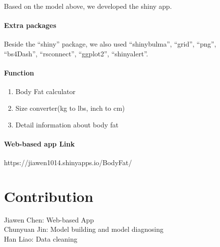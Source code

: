\documentclass[11pt]{article}
\providecommand{\tightlist}{%
      \setlength{\itemsep}{0pt}\setlength{\parskip}{0pt}}
\begin{document}
Based on the model above, we developed the shiny app.

\hypertarget{extra-packages}{%
\paragraph{Extra packages}\label{extra-packages}}

Beside the ``shiny'' package, we also used ``shinybulma'', ``grid'',
``png'', ``bs4Dash'', ``rsconnect'', ``ggplot2'', ``shinyalert''.

\hypertarget{function}{%
\paragraph{Function}\label{function}}

\begin{enumerate}
\def\labelenumi{\arabic{enumi}.}
\tightlist
\item
  Body Fat calculator
\item
  Size converter(kg to lbs, inch to cm)
\item
  Detail information about body fat
\end{enumerate}

\hypertarget{web-based-app-link}{%
\paragraph{Web-based app Link}\label{web-based-app-link}}

https://jiawen1014.shinyapps.io/BodyFat/

\hypertarget{contribution}{%
\section{Contribution}\label{contribution}}

Jiawen Chen: Web-based App\\
Chunyuan Jin: Model building and model diagnosing\\
Han Liao: Data cleaning


    
    
    
    
\end{document}
